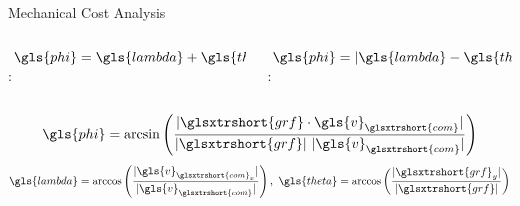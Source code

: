 \begin{frame}{Mechanical Cost Analysis~\cite{Lee2011}}%
    \begin{columns}[T,onlytextwidth]%
        \begin{column}[T]{0.5\textwidth}%
            $~\gls{phi} = \gls{lambda} + \gls{theta} \neq 0$:
            \begin{figure}[htb]%
                \centering%
                
            \end{figure}%
        \end{column}%
        \begin{column}[T]{0.5\textwidth}%
            $~\gls{phi} = \lvert\gls{lambda} - \gls{theta}\rvert = 0$:
            \begin{figure}[htb]%
                \centering%
                
            \end{figure}%
        \end{column}%
    \end{columns}%
    \begin{align}
        \gls{phi} = \textrm{arcsin}\left(\frac{\vert\glsxtrshort{grf} \cdot \gls{v}_{\glsxtrshort{com}}\vert}{\vert\glsxtrshort{grf}\vert~\vert\gls{v}_{\glsxtrshort{com}}\vert}\right) \notag
    \end{align}
    \begin{align}
        \gls{lambda} = \textrm{arccos}\left(\frac{\vert\gls{v}_{\glsxtrshort{com}_x}\vert}{\vert\gls{v}_{\glsxtrshort{com}}\vert}\right),~
        \gls{theta} = \textrm{arccos}\left(\frac{\vert\glsxtrshort{grf}_y\vert}{\vert\glsxtrshort{grf}\vert}\right) \notag
    \end{align}
\end{frame}%
%